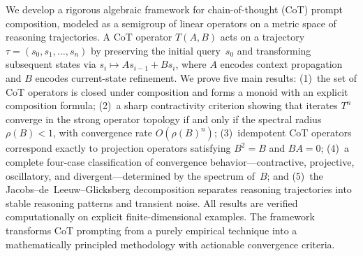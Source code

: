 We develop a rigorous algebraic framework for chain-of-thought (CoT) prompt
composition, modeled as a semigroup of linear operators on a metric space of
reasoning trajectories. A CoT operator $T(A,B)$ acts on a trajectory
$\tau=(s_0,s_1,\dots,s_n)$ by preserving the initial query~$s_0$ and
transforming subsequent states via $s_i\mapsto As_{i-1}+Bs_i$, where $A$
encodes context propagation and $B$ encodes current-state refinement. We prove
five main results: (1)~the set of CoT operators is closed under composition
and forms a monoid with an explicit composition formula; (2)~a sharp
contractivity criterion showing that iterates $T^n$ converge in the strong
operator topology if and only if the spectral radius $\rho(B)<1$, with
convergence rate $O(\rho(B)^n)$; (3)~idempotent CoT operators correspond
exactly to projection operators satisfying $B^2=B$ and $BA=0$; (4)~a complete
four-case classification of convergence behavior---contractive, projective,
oscillatory, and divergent---determined by the spectrum of~$B$; and (5)~the
Jacobs--de~Leeuw--Glicksberg decomposition separates reasoning trajectories
into stable reasoning patterns and transient noise. All results are verified
computationally on explicit finite-dimensional examples. The framework
transforms CoT prompting from a purely empirical technique into a
mathematically principled methodology with actionable convergence criteria.
